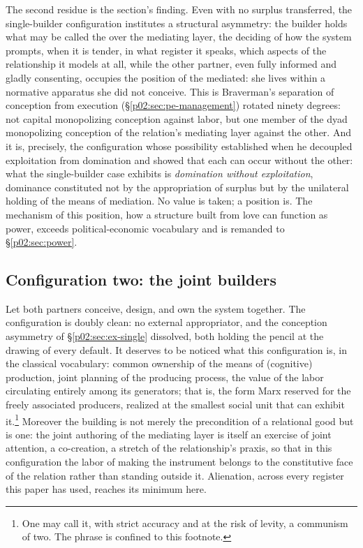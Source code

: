 The second residue is the section's finding. Even with no surplus transferred, the single-builder configuration institutes a structural asymmetry: the builder holds what may be called the  over the mediating layer, the deciding of how the system prompts, when it is tender, in what register it speaks, which aspects of the relationship it models at all, while the other partner, even fully informed and gladly consenting, occupies the position of the mediated: she lives within a normative apparatus she did not conceive. This is Braverman's separation of conception from execution (\S\ref{p02:sec:pe-management}) rotated ninety degrees: not capital monopolizing conception against labor, but one member of the dyad monopolizing conception of the relation's mediating layer against the other. And it is, precisely, the configuration whose possibility \textcite{roemer1982general} established when he decoupled exploitation from domination and showed that each can occur without the other: what the single-builder case exhibits is \emph{domination without exploitation}, dominance constituted not by the appropriation of surplus but by the unilateral holding of the means of mediation. No value is taken; a position is. The mechanism of this position, how a structure built from love can function as power, exceeds political-economic vocabulary and is remanded to \S\ref{p02:sec:power}.

\subsection{Configuration two: the joint builders}
\label{p02:sec:ex-joint}

Let both partners conceive, design, and own the system together. The configuration is doubly clean: no external appropriator, and the conception asymmetry of \S\ref{p02:sec:ex-single} dissolved, both holding the pencil at the drawing of every default. It deserves to be noticed what this configuration is, in the classical vocabulary: common ownership of the means of (cognitive) production, joint planning of the producing process, the value of the labor circulating entirely among its generators; that is, the form Marx reserved for the freely associated producers, realized at the smallest social unit that can exhibit it.\footnote{One may call it, with strict accuracy and at the risk of levity, a communism of two. The phrase is confined to this footnote.} Moreover the building is not merely the precondition of a relational good but is one: the joint authoring of the mediating layer is itself an exercise of joint attention, a co-creation, a stretch of the relationship's praxis, so that in this configuration the labor of making the instrument belongs to the constitutive face of the relation rather than standing outside it. Alienation, across every register this paper has used, reaches its minimum here.

